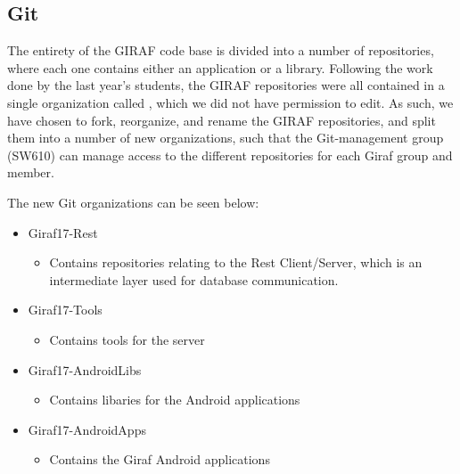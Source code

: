 \subsection{Git}\label{GitTool}
The entirety of the GIRAF code base is divided into a number of repositories,
where each one contains either an application or a library. Following the work
done by the last year's students, the GIRAF repositories  were all contained in
a single organization called , which we did not have permission to
edit. As such, we have chosen to fork, reorganize, and rename the GIRAF
repositories, and split them into a number of new organizations, such that the
Git-management group (SW610) can manage access to the different repositories
for each Giraf group and member.



The new Git organizations can be seen below:
\begin{itemize}
	\item Giraf17-Rest
	\begin{itemize}
  		\item Contains repositories relating to the Rest Client/Server, which is an
  		intermediate layer used for database communication.
	\end{itemize}
  	\item Giraf17-Tools
  	\begin{itemize}
  		\item Contains tools for the server
	\end{itemize}
  	\item Giraf17-AndroidLibs
  	\begin{itemize}
  		\item Contains libaries for the Android applications
	\end{itemize}
  	\item Giraf17-AndroidApps
  	\begin{itemize}
  		\item Contains the Giraf Android applications 
	\end{itemize}
\end{itemize}